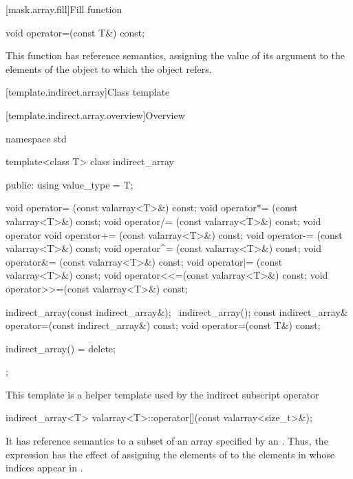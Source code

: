 [mask.array.fill]{Fill function}

%
\begin{itemdecl}
void operator=(const T&) const;
\end{itemdecl}

\begin{itemdescr}
\pnum
This function has reference semantics, assigning the value of its
argument to the elements of the
object to which the
object refers.
\end{itemdescr}

[template.indirect.array]{Class template }

[template.indirect.array.overview]{Overview}

%
%
\begin{codeblock}
namespace std {
  template<class T> class indirect_array {
  public:
    using value_type = T;

    void operator=  (const valarray<T>&) const;
    void operator*= (const valarray<T>&) const;
    void operator/= (const valarray<T>&) const;
    void operator%
    void operator+= (const valarray<T>&) const;
    void operator-= (const valarray<T>&) const;
    void operator^= (const valarray<T>&) const;
    void operator&= (const valarray<T>&) const;
    void operator|= (const valarray<T>&) const;
    void operator<<=(const valarray<T>&) const;
    void operator>>=(const valarray<T>&) const;

    indirect_array(const indirect_array&);
    ~indirect_array();
    const indirect_array& operator=(const indirect_array&) const;
    void operator=(const T&) const;

    indirect_array() = delete;
  };
}
\end{codeblock}

\pnum
This template is a helper template used by the indirect subscript operator

%
\begin{itemdecl}
indirect_array<T> valarray<T>::operator[](const valarray<size_t>&);
\end{itemdecl}

\pnum
It has reference semantics to a subset of an array specified by an
.
Thus, the expression
has the effect of assigning the elements of
to the elements in
whose indices appear in
.

